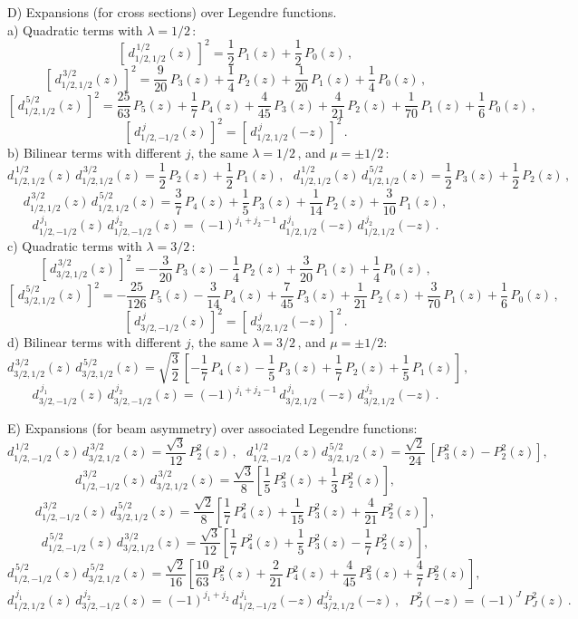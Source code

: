 \documentclass[prc,reprint,onecolumn,amsmath,amssymb,superscriptaddress]{revtex4-1}
\begin{document}
D) Expansions (for cross sections) over Legendre functions.\\
a) Quadratic terms with $\lambda=1/2\,$:
$$ 
	[\,d^{\,1/2}_{1/2,1/2}(z)\,]^2=\frac12\,P_1(z)+\frac12\,P_0(z)\,,
$$
$$ 
	[\,d^{\,3/2}_{1/2,1/2}(z)\,]^2=\frac9{20}\,P_3(z)+\frac14\,P_2(z)+
	\frac1{20}\,P_1(z)+\frac14\,P_0(z)\,,
$$
$$ 
	[\,d^{\,5/2}_{1/2,1/2}(z)\,]^2=\frac{25}{63}\,P_5(z)+\frac17\,P_4(z)+
	\frac4{45}\,P_3(z)+\frac4{21}\,P_2(z)+\frac1{70}\,P_1(z)+\frac16\,P_0(z)\,,
$$
$$ 
	[\,d^{\,j}_{1/2,-1/2}(z)\,]^2=[\,d^{\,j}_{1/2,1/2}(-z)\,]^2
\,.
$$
b) Bilinear terms with different $j$, the same $\lambda=1/2\,$, and $\mu=\pm1/2\,$:
$$ 
	d^{\,1/2}_{1/2,1/2}(z)\,d^{\,3/2}_{1/2,1/2}(z)=\frac12\,P_2(z)+\frac12\,P_1(z)\,,~~~
	d^{\,1/2}_{1/2,1/2}(z)\,d^{\,5/2}_{1/2,1/2}(z)=\frac12\,P_3(z)+\frac12\,P_2(z)\,,
$$
$$ 
	d^{\,3/2}_{1/2,1/2}(z)\,d^{\,5/2}_{1/2,1/2}(z)=\frac37\,P_4(z)+\frac15\,P_3(z)+
	\frac1{14}\,P_2(z)+\frac3{10}\,P_1(z)\,,
$$
$$ 
	d^{\,j_1}_{1/2,-1/2}(z)\,d^{\,j_2}_{1/2,-1/2}(z)=(-1)^{j_1+j_2-1}\,
	d^{\,j_1}_{1/2,1/2}(-z)\,d^{\,j_2}_{1/2,1/2}(-z)\,.
$$
c) Quadratic terms with $\lambda=3/2\,$:
$$ 
	[\,d^{\,3/2}_{3/2,1/2}(z)\,]^2=-\frac3{20}\,P_3(z)-\frac14\,P_2(z)
	+\frac3{20}\,P_1(z)+\frac14\,P_0(z)\,,
$$
$$ 
	[\,d^{\,5/2}_{3/2,1/2}(z)\,]^2=-\frac{25}{126}\,P_5(z)-\frac3{14}\,P_4(z)+
	\frac7{45}\,P_3(z)+\frac1{21}\,P_2(z)+\frac3{70}\,P_1(z)+\frac16\,P_0(z)\,,
$$
$$ 
	[\,d^{\,j}_{3/2,-1/2}(z)\,]^2=[\,d^{\,j}_{3/2,1/2}(-z)\,]^2\,.
$$
d) Bilinear terms with different $j$, the same $\lambda=3/2\,$, and $\mu=\pm1/2$:
$$ 
	d^{\,3/2}_{3/2,1/2}(z)\,d^{\,5/2}_{3/2,1/2}(z)=\sqrt{\frac32}\,\left[-\frac17\,
	P_4(z)-\frac15\,P_3(z)+\frac17\,P_2(z)+\frac15\,P_1(z)\right]\,,
$$
$$ 
	d^{\,j_1}_{3/2,-1/2}(z)\,d^{\,j_2}_{3/2,-1/2}(z)=(-1)^{j_1+j_2-1}\,
	d^{\,j_1}_{3/2,1/2}(-z)\,d^{\,j_2}_{3/2,1/2}(-z)\,.
$$

E) Expansions (for beam asymmetry) over associated Legendre functions:
$$  
	d^{\,1/2}_{1/2,-1/2}(z)\,d^{\,3/2}_{3/2,1/2}(z)
	=\frac{\sqrt{3}}{12}\,P_2^2(z)\,,~~~
	d^{\,1/2}_{1/2,-1/2}(z)\,d^{\,5/2}_{3/2,1/2}(z)=\frac{\sqrt{2}}{24}\,
	\left[P_3^2(z)-P_2^2(z)\right],
$$
$$ 
	d^{\,3/2}_{1/2,-1/2}(z)\,d^{\,3/2}_{3/2,1/2}(z)=
	\frac{\sqrt{3}}{8}\left[\frac15\,P_3^2(z)+\frac13\,P_2^2(z)\right],  
$$%
$$ 
	d^{\,3/2}_{1/2,-1/2}(z)\,d^{\,5/2}_{3/2,1/2}(z)=
	\frac{\sqrt{2}}{8}\left[\frac17\,P_4^2(z)+\frac1{15}\,P_3^2(z)+\frac4{21}\,
	P_2^2(z)\right],
$$
$$  
	d^{\,5/2}_{1/2,-1/2}(z)\,d^{\,3/2}_{3/2,1/2}(z)=
	\frac{\sqrt{3}}{12}\left[\frac17\,P_4^2(z)+\frac15\,P_3^2(z)-\frac17\,
	P_2^2(z)\right],
$$
$$  
	d^{\,5/2}_{1/2,-1/2}(z)\,d^{\,5/2}_{3/2,1/2}(z)=
	\frac{\sqrt{2}}{16}\left[\frac{10}{63}\,P_5^2(z)+\frac2{21}\,P_4^2(z)+
	\frac4{45}\,P_3^2(z)+\frac47\,P_2^2(z)\right],
$$
$$ 
	d^{\,j_1}_{1/2,1/2}(z)\,d^{\,j_2}_{3/2,-1/2}(z)=(-1)^{j_1+j_2}\,
	d^{\,j_1}_{1/2,-1/2}(-z)\,d^{\,j_2}_{3/2,1/2}(-z)\,,~~~
	P_J^2(-z)=(-1)^J\,P_J^2(z)\,.
$$
\end{document}

